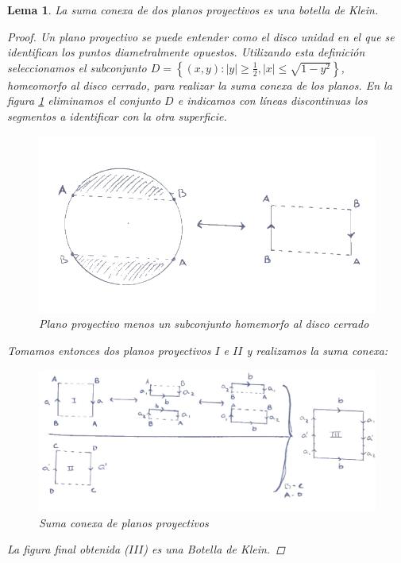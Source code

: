 \documentclass[a4paper,11pt,spanish, twoside, leqno]{tfg-uam}
\newtheorem{lema}[teor]{Lema}
\theoremstyle{definition}
\begin{document}
\begin{lema}\label{lema:sumadedosplanosproyectivos}
	La suma conexa de dos planos proyectivos es una botella de Klein.
	\begin{proof}
		Un plano proyectivo se puede entender como el disco unidad en el que se identifican los puntos diametralmente opuestos. Utilizando esta definición seleccionamos el subconjunto $D = \left\{(x,y): |y|\geq\frac{1}{2}, |x|\leq\sqrt{1-y^2} \right\}$, homeomorfo al disco cerrado, para realizar la suma conexa de los planos. En la figura  \ref{fig:parte1SumaConexaDePlanosP} eliminamos el conjunto $D$ e indicamos con líneas discontinuas los segmentos a identificar con la otra superficie.
		
		\begin{figure}[h]\label{fig:parte1SumaConexaDePlanosP}
			\centering
			\includegraphics[width=0.7\linewidth]{imagenes/p1planop.png}
			\caption{Plano proyectivo menos un subconjunto homemorfo al disco cerrado}
		\end{figure} 
	
		Tomamos entonces dos planos proyectivos $I$ e $II$ y realizamos la suma conexa:
		
		\begin{figure}[h]\label{fig:sumaconexadepps}
			\centering
			\includegraphics[width=0.8\linewidth]{imagenes/sumapps.png}
			\caption{Suma conexa de planos proyectivos}
		\end{figure} 
		La figura final obtenida ($III$) es una \textit{Botella de Klein}.
	\end{proof}
\end{lema}
\end{document}
